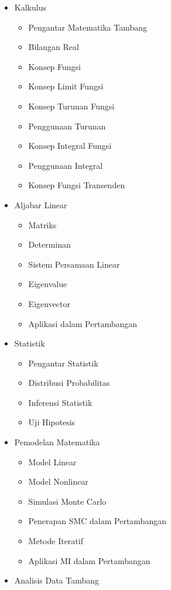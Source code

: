 \documentclass[
]{book}
\providecommand{\tightlist}{%
  \setlength{\itemsep}{0pt}\setlength{\parskip}{0pt}}
\begin{document}
\begin{itemize}
\tightlist
\item
  Kalkulus

  \begin{itemize}
  \tightlist
  \item
    Pengantar Matematika Tambang
  \item
    Bilangan Real
  \item
    Konsep Fungsi
  \item
    Konsep Limit Fungsi
  \item
    Konsep Turunan Fungsi
  \item
    Penggunaan Turunan
  \item
    Konsep Integral Fungsi
  \item
    Penggunaan Integral
  \item
    Konsep Fungsi Transenden
  \end{itemize}
\item
  Aljabar Linear

  \begin{itemize}
  \tightlist
  \item
    Matriks
  \item
    Determinan
  \item
    Sistem Persamaan Linear
  \item
    Eigenvalue
  \item
    Eigenvector
  \item
    Aplikasi dalam Pertambangan
  \end{itemize}
\item
  Statistik

  \begin{itemize}
  \tightlist
  \item
    Pengantar Statistik
  \item
    Distribusi Probabilitas
  \item
    Inferensi Statistik
  \item
    Uji Hipotesis
  \end{itemize}
\item
  Pemodelan Matematika

  \begin{itemize}
  \tightlist
  \item
    Model Linear
  \item
    Model Nonlinear
  \item
    Simulasi Monte Carlo
  \item
    Penerapan SMC dalam Pertambangan
  \item
    Metode Iteratif
  \item
    Aplikasi MI dalam Pertambangan
  \end{itemize}
\item
  Analisis Data Tambang


\end{itemize}
\end{document}
